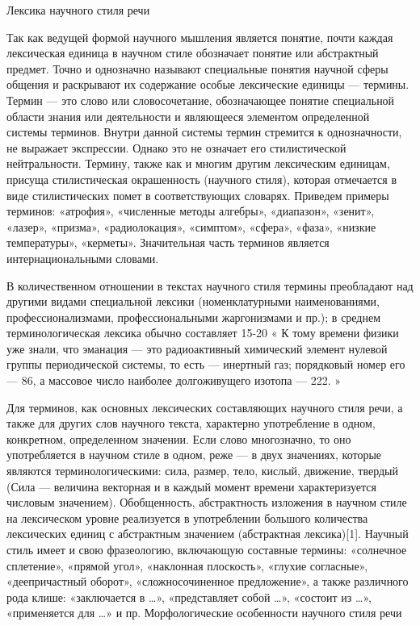 \documentclass[12pt]{llncs}
\begin{document}
Лексика научного стиля речи

Так как ведущей формой научного мышления является понятие, почти каждая лексическая единица в научном стиле обозначает понятие или абстрактный предмет. Точно и однозначно называют специальные понятия научной сферы общения и раскрывают их содержание особые лексические единицы — термины. Термин — это слово или словосочетание, обозначающее понятие специальной области знания или деятельности и являющееся элементом определенной системы терминов. Внутри данной системы термин стремится к однозначности, не выражает экспрессии. Однако это не означает его стилистической нейтральности. Термину, также как и многим другим лексическим единицам, присуща стилистическая окрашенность (научного стиля), которая отмечается в виде стилистических помет в соответствующих словарях. Приведем примеры терминов: «атрофия», «численные методы алгебры», «диапазон», «зенит», «лазер», «призма», «радиолокация», «симптом», «сфера», «фаза», «низкие температуры», «керметы». Значительная часть терминов является интернациональными словами.

В количественном отношении в текстах научного стиля термины преобладают над другими видами специальной лексики (номенклатурными наименованиями, профессионализмами, профессиональными жаргонизмами и пр.); в среднем терминологическая лексика обычно составляет 15-20 %
« 	К тому времени физики уже знали, что эманация — это радиоактивный химический элемент нулевой группы периодической системы, то есть — инертный газ; порядковый номер его — 86, а массовое число наиболее долгоживущего изотопа — 222. 	»

Для терминов, как основных лексических составляющих научного стиля речи, а также для других слов научного текста, характерно употребление в одном, конкретном, определенном значении. Если слово многозначно, то оно употребляется в научном стиле в одном, реже — в двух значениях, которые являются терминологическими: сила, размер, тело, кислый, движение, твердый (Сила — величина векторная и в каждый момент времени характеризуется числовым значением). Обобщенность, абстрактность изложения в научном стиле на лексическом уровне реализуется в употреблении большого количества лексических единиц с абстрактным значением (абстрактная лексика)[1]. Научный стиль имеет и свою фразеологию, включающую составные термины: «солнечное сплетение», «прямой угол», «наклонная плоскость», «глухие согласные», «деепричастный оборот», «сложносочиненное предложение», а также различного рода клише: «заключается в …», «представляет собой …», «состоит из …», «применяется для …» и пр.
Морфологические особенности научного стиля речи
\end{document}

